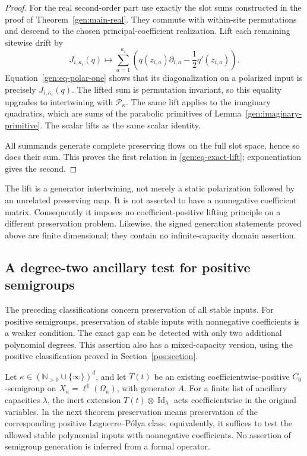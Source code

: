 \documentclass[reqno]{amsart}
\theoremstyle{definition}
\theoremstyle{remark}
\newcommand{\N}{\mathbb N}
\DeclareMathOperator{\Id}{Id}
\begin{document}
\begin{proof}
For the real second-order part use exactly the slot sums
constructed in the proof of
Theorem~\ref{gen:main-real}.
They commute with within-site permutations and descend to the
chosen principal-coefficient realization.
Lift each remaining sitewise drift by
\[
 J_{i,\kappa_i}(q)
 \longmapsto
 \sum_{a=1}^{\kappa_i}
 \left(q(z_{i,a})\partial_{i,a}
                    -\frac12q'(z_{i,a})\right).
\]
Equation~\eqref{gen:eq-polar-one} shows that its diagonalization
on a polarized input is precisely \(J_{i,\kappa_i}(q)\).
The lifted sum is permutation invariant, so this equality
upgrades to intertwining with \(\mathcal P_\kappa\).
The same lift applies to the imaginary quadratics, which are
sums of the parabolic primitives of
Lemma~\ref{gen:imaginary-primitive}.
The scalar lifts as the same scalar identity.

All summands generate complete preserving flows on the full
slot space, hence so does their sum.
This proves the first relation in
\eqref{gen:eq-exact-lift}; exponentiation gives the second.
\end{proof}

The lift is a generator intertwining, not merely a static
polarization followed by an unrelated preserving map.
It is not asserted to have a nonnegative coefficient matrix.
Consequently it imposes no coefficient-positive lifting
principle on a different preservation problem.
Likewise, the signed generation statements proved above are
finite dimensional; they contain no infinite-capacity domain assertion.

\subsection{A degree-two ancillary test for positive semigroups}

The preceding classifications concern preservation of all stable inputs.
For positive semigroups, preservation of stable inputs with nonnegative
coefficients is a weaker condition.  The exact gap can be detected with
only two additional polynomial degrees.  This assertion also has a
mixed-capacity version, using the positive classification proved in
Section~\ref{pos:section}.

Let \(\kappa\in(\N_{>0}\cup\{\infty\})^d\), and let \(T(t)\) be an existing
coefficientwise-positive \(C_0\)-semigroup on
\(X_\kappa=\ell^1(\Omega_\kappa)\), with generator \(A\).
For a finite list of ancillary capacities \(\lambda\), the inert extension
\(T(t)\otimes\Id_\lambda\) acts coefficientwise in the original variables.
In the next theorem preservation means preservation of the corresponding
positive Laguerre--P\'olya class; equivalently, it suffices to test the
allowed stable polynomial inputs with nonnegative coefficients.
No assertion of semigroup generation is inferred from a formal operator.
\end{document}

